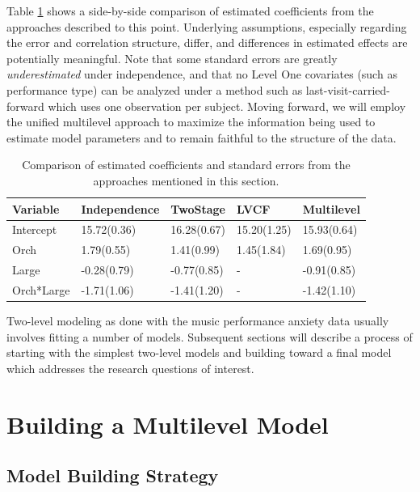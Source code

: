 \documentclass[
]{krantz}
\begin{document}
Table \ref{tab:table3chp8} shows a side-by-side comparison of estimated coefficients from the approaches described to this point. Underlying assumptions, especially regarding the error and correlation structure, differ, and differences in estimated effects are potentially meaningful. Note that some standard errors are greatly \emph{underestimated} under independence, and that no Level One covariates (such as performance type) can be analyzed under a method such as last-visit-carried-forward which uses one observation per subject. Moving forward, we will employ the unified multilevel approach to maximize the information being used to estimate model parameters and to remain faithful to the structure of the data.

\begin{table}

\caption{\label{tab:table3chp8}Comparison of estimated coefficients and standard errors from the approaches mentioned in this section.}
\centering
\begin{tabular}[t]{lllll}
\toprule
Variable & Independence & TwoStage & LVCF & Multilevel\\
\midrule
Intercept & 15.72(0.36) & 16.28(0.67) & 15.20(1.25) & 15.93(0.64)\\
Orch & 1.79(0.55) & 1.41(0.99) & 1.45(1.84) & 1.69(0.95)\\
Large & -0.28(0.79) & -0.77(0.85) & - & -0.91(0.85)\\
Orch*Large & -1.71(1.06) & -1.41(1.20) & - & -1.42(1.10)\\
\bottomrule
\end{tabular}
\end{table}

Two-level modeling as done with the music performance anxiety data usually involves fitting a number of models. Subsequent sections will describe a process of starting with the simplest two-level models and building toward a final model which addresses the research questions of interest.

\hypertarget{sec:buildmodel}{%
\section{Building a Multilevel Model}\label{sec:buildmodel}}

\hypertarget{buildstrategy}{%
\subsection{Model Building Strategy}\label{buildstrategy}}
\end{document}

